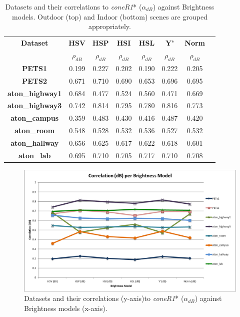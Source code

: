 \begin{table}
\centering
\begin{tabular}{ |c|c|c|c|c|c|c|c| }
	\hline
	\textbf{Dataset} & \textbf{HSV} & \textbf{HSP} & \textbf{HSI} & \textbf{HSL}& \textbf{Y'} & \textbf{Norm} \\
		\textbf{} & $\rho_{dB}$ & $\rho_{dB}$ & $\rho_{dB}$ & $\rho_{dB}$ & $\rho_{dB}$ & $\rho_{dB}$ \\
	\hline
	\hline
	\textbf{PETS1} & 0.199 & 0.227 & 0.202 & 0.190 & 0.222 & 0.205 \\
	\hline
	\textbf{PETS2} & 0.671 & 0.710 & 0.690 & 0.653 & 0.696 & 0.695 \\
	\hline
	\textbf{aton\_highway1} & 0.684 & 0.477 & 0.524 & 0.560 & 0.471 & 0.669 \\
	\hline
	\textbf{aton\_highway3} & 0.742 & 0.814 & 0.795 & 0.780 & 0.816 & 0.773 \\
	\hline
	\textbf{aton\_campus} & 0.359 & 0.483 & 0.430 & 0.416 & 0.487 & 0.420 \\
	\hline
	\hline
	\textbf{aton\_room} & 0.548 & 0.528 & 0.532 & 0.536 & 0.527 & 0.532 \\
	\hline
	\textbf{aton\_hallway} & 0.656 & 0.625 & 0.617 & 0.622 & 0.618 & 0.601 \\
	\hline
	\textbf{aton\_lab} & 0.695 & 0.710 & 0.705 & 0.717 & 0.710 & 0.708 \\
	\hline
\end{tabular}
\caption{Datasets and their correlations to \textit{coneR1}* ($\alpha_{dB}$) against Brightness models. Outdoor (top) and Indoor (bottom) scenes are grouped appropriately.}
\label{table:brightness_corr_db}
\end{table}

\begin{figure}
  \includegraphics[width=\linewidth]{figures/correlation_x_db.jpg}
  \caption{Datasets and their correlations (y-axis)to \textit{coneR1}* ($\alpha_{dB}$) against Brightness models (x-axis).}
\label{fig:brightness_corr_db}
\end{figure}


